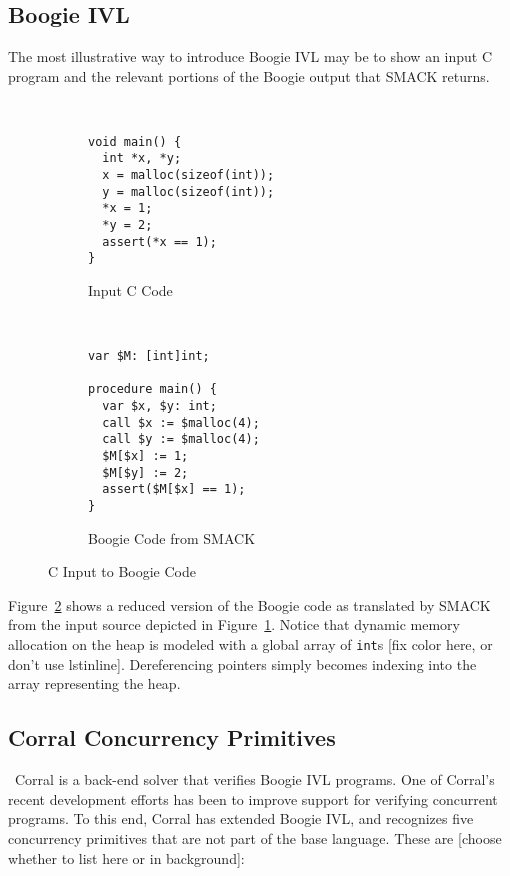 \subsection{Boogie IVL}
The most illustrative way to introduce Boogie IVL may be to show an
input C program and the relevant portions of the Boogie output that
SMACK returns.
\begin{figure}[h]
\centering
\begin{subfigure}[b]{.45\textwidth}
\centering
\begin{lstlisting}


void main() {
  int *x, *y;
  x = malloc(sizeof(int));
  y = malloc(sizeof(int));
  *x = 1;
  *y = 2;
  assert(*x == 1);
}
\end{lstlisting}
\caption{Input C Code}\label{fig:cToBoogie_a}
\end{subfigure}
~
\begin{subfigure}[b]{.45\textwidth}
\centering
\begin{lstlisting}[language=boogie]
var $M: [int]int;

procedure main() {
  var $x, $y: int;
  call $x := $malloc(4);
  call $y := $malloc(4);
  $M[$x] := 1;
  $M[$y] := 2;
  assert($M[$x] == 1);
}
\end{lstlisting}
\caption{Boogie Code from SMACK}\label{fig:cToBoogie_b}
\end{subfigure}
\caption{C Input to Boogie Code}\label{fig:cToBoogie}
\end{figure}

Figure~\ref{fig:cToBoogie_b} shows a reduced version of the Boogie
code as translated by SMACK from the input source depicted in
Figure~\ref{fig:cToBoogie_a}.  Notice that dynamic memory allocation
on the heap is modeled with a global array of \lstinline|int|s [fix
color here, or don't use lstinline].  Dereferencing pointers simply
becomes indexing into the array representing the heap. 

\subsection{Corral Concurrency Primitives}\
Corral is a back-end solver that verifies Boogie IVL programs.  One of
Corral's recent development efforts has been to improve support for
verifying concurrent programs.  To this end, Corral has extended
Boogie IVL, and recognizes five concurrency primitives that are not
part of the base language.  These are [choose whether to list here or
in background]: 


